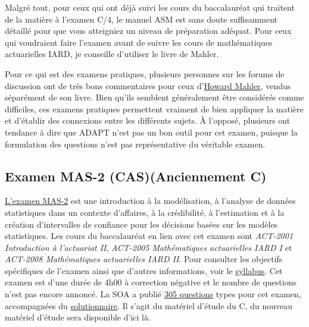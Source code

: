 Malgré tout, pour ceux qui ont déjà suivi les cours du baccalauréat qui traitent de la matière à l'examen C/4, le manuel ASM est sans doute suffisamment détaillé pour que vous atteigniez un niveau de préparation adéquat. Pour ceux qui voudraient faire l'examen avant de suivre les cours de mathématiques actuarielles IARD, je conseille d'utiliser le livre de Mahler.\vspace{\baselineskip}

Pour ce qui est des examens pratiques, plusieurs personnes sur les forums de discussion ont de très bons commentaires pour ceux d'\href{http://howardmahler.com/Teaching/C.html}{Howard Mahler}, vendus séparément de son livre. Bien qu'ils semblent généralement être considérés comme difficiles, ces examens pratiques permettent vraiment de bien appliquer la matière et d'établir des connexions entre les différents sujets. À l'opposé, plusieurs ont tendance à dire que ADAPT n'est pas un bon outil pour cet examen, puisque la formulation des questions n'est pas représentative du véritable examen. 

\subsection*{Examen MAS-2 (CAS)(Anciennement C)}
\label{subsec:examMAS_2}
\href{http://www.casact.org/admissions/syllabus/index.cfm?fa=MASII&parentID=392}{L'examen MAS-2} est une introduction à la modélisation, à l'analyse de données statistiques dans un contexte d'affaires, à la crédibilité, à l'estimation et à la création d'intervalles de confiance pour les décisions basées sur les modèles statistiques. Les cours du baccalauréat en lien avec cet examen sont \textit{ACT-2001 Introduction à l'actuariat II}, \textit{ACT-2005 Mathématiques actuarielles IARD I} et \textit{ACT-2008 Mathématiques actuarielles IARD II}. Pour consulter les objectifs spécifiques de l'examen ainsi que d'autres informations, voir le \href{http://www.casact.org/cms/files/Exam_MAS-II_2018_v20_2017_01_13_1.pdf}{syllabus}. Cet examen est d'une durée de 4h00 à correction négative et le nombre de questions n'est pas encore annoncé. La SOA a publié \href{http://www.soa.org/files/edu/edu-exam-c-sample-quest.pdf}{305 questions} types pour cet examen, accompagnées du \href{http://www.soa.org/files/edu/edu-exam-c-sample-sol.pdf}{solutionnaire}. Il s'agit du matériel d'étude du C, du nouveau matériel d'étude sera disponible d'ici là.\vspace{\baselineskip}

